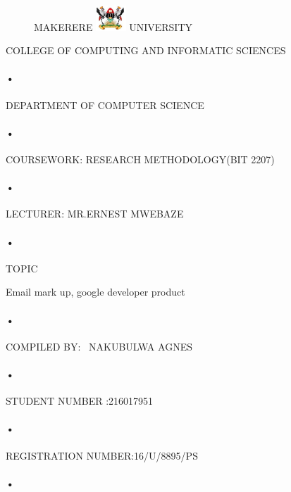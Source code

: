 \documentclass[9pt,a4paper]{article}
\begin{document}
\begin{titlepage}
  \begin{figure}[h]
  \centerline{\small MAKERERE 
  \includegraphics[width=0.1\textwidth]{muk_log} UNIVERSITY}
\end{figure}
\centerline{COLLEGE OF COMPUTING AND INFORMATIC SCIENCES}
\paragraph{•}
\centerline{DEPARTMENT OF COMPUTER SCIENCE\\}
\paragraph{•}

\centerline{COURSEWORK: RESEARCH METHODOLOGY(BIT 2207)\\}
\paragraph{•}

\centerline{LECTURER: MR.ERNEST MWEBAZE}
\paragraph{•}

\centerline{TOPIC\\}Email mark up, google developer product \\
\paragraph{•}
\centerline{COMPILED BY: \
 NAKUBULWA AGNES}
 \paragraph{•}
\centerline{STUDENT NUMBER :216017951}
\paragraph{•}
\centerline{REGISTRATION NUMBER:16/U/8895/PS}
\paragraph{•}
\end{titlepage}
\end{document}
